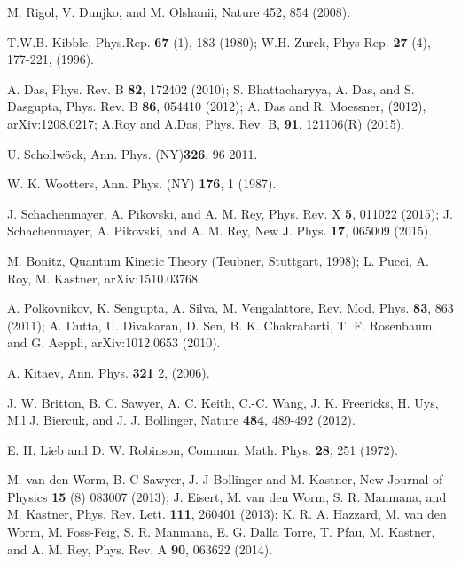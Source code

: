 \documentclass[a4paper,11pt,color]{article}
\renewenvironment{thebibliography}[1]{%
    \begin{oldthebibliography}{#1}%
      \setlength{\parskip}{0ex}%
      \setlength{\itemsep}{0ex}%
  }%
  {%
    \end{oldthebibliography}%
  }
\begin{document}
\begin{thebibliography}{}
  
M. Rigol, V. Dunjko, and M. Olshanii, Nature 452, 854 (2008).

T.W.B. Kibble, Phys.Rep. {\bf 67} (1), 183 (1980); W.H. Zurek, Phys Rep. {\bf 27} (4), 177-221, (1996).

A. Das, Phys. Rev. B {\bf 82}, 172402 (2010); S. Bhattacharyya, A. Das, and S. Dasgupta, Phys. Rev.
B {\bf 86}, 054410 (2012); A. Das and R. Moessner, (2012), arXiv:1208.0217; A.Roy and A.Das, Phys. Rev. B, {\bf 91}, 121106(R) (2015).

%
 {U.} {Schollw{\"o}ck},  {Ann. Phys. (NY)}\textbf {{326}}, {96}  {2011}.
 
W. K. Wootters, Ann. Phys. (NY) {\bf 176}, 1 (1987).

J. Schachenmayer, A. Pikovski, and A. M. Rey, Phys. Rev. X {\bf 5}, 011022 (2015); J. Schachenmayer, A. Pikovski, and A. M. Rey, New J. Phys.
{\bf 17}, 065009 (2015).

M. Bonitz, Quantum Kinetic Theory (Teubner, Stuttgart, 1998); L. Pucci, A. Roy, M. Kastner, arXiv:1510.03768.


A. Polkovnikov, K. Sengupta, A. Silva, M. Vengalattore, Rev. Mod. Phys. \textbf{83}, 863 (2011); A. Dutta, U. Divakaran, D. Sen, B. K. Chakrabarti, T. F. Rosenbaum, and G. Aeppli, arXiv:1012.0653 (2010).


A. Kitaev, Ann. Phys. {\bf 321} 2, (2006).


J. W. Britton,	B. C. Sawyer,	A. C. Keith,	C.-C. Wang,	J. K. Freericks, H. Uys,	M.l J. Biercuk, and J. J. Bollinger, Nature {\bf 484}, 489-492 (2012).



E. H. Lieb and D. W. Robinson, Commun. Math. Phys. {\bf 28}, 251 (1972).

M. van den Worm, B. C Sawyer, J. J Bollinger and M. Kastner, New Journal of Physics {\bf 15} (8) 083007 (2013); J. Eisert, M. van den Worm, S. R. Manmana, and M. Kastner, Phys. Rev. Lett. {\bf 111}, 260401 (2013); K. R. A. Hazzard, M. van den Worm, M. Foss-Feig, S. R. Manmana, E. G. Dalla Torre, T. Pfau, M. Kastner, and A. M. Rey, Phys. Rev. A {\bf 90}, 063622 (2014).



\end{thebibliography}
\end{document}
